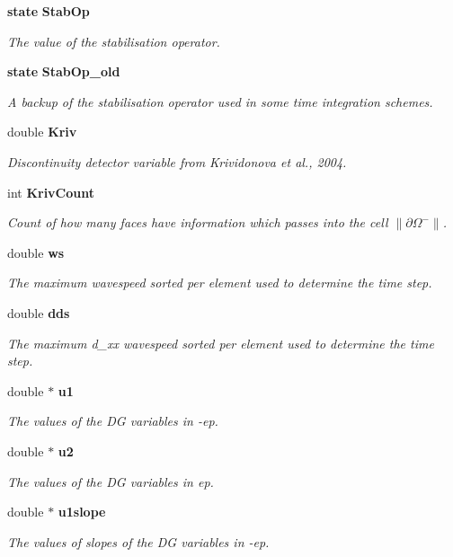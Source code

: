 \begin{DoxyCompactItemize}
{\bf state} {\bf Stab\-Op}
\begin{DoxyCompactList}\small\item\em The value of the stabilisation operator. \end{DoxyCompactList}\item 
{\bf state} {\bf Stab\-Op\-\_\-old}
\begin{DoxyCompactList}\small\item\em A backup of the stabilisation operator used in some time integration schemes. \end{DoxyCompactList}\item 
double {\bf Kriv}
\begin{DoxyCompactList}\small\item\em Discontinuity detector variable from Krividonova et al., 2004. \end{DoxyCompactList}\item 
int {\bf Kriv\-Count}
\begin{DoxyCompactList}\small\item\em Count of how many faces have information which passes into the cell $\| \partial\Omega^- \|$. \end{DoxyCompactList}\item 
double {\bf ws}
\begin{DoxyCompactList}\small\item\em The maximum wavespeed sorted per element used to determine the time step. \end{DoxyCompactList}\item 
double {\bf dds}
\begin{DoxyCompactList}\small\item\em The maximum d\-\_\-xx wavespeed sorted per element used to determine the time step. \end{DoxyCompactList}\item 
double $\ast$ {\bf u1}
\begin{DoxyCompactList}\small\item\em The values of the D\-G variables in -\/ep. \end{DoxyCompactList}\item 
double $\ast$ {\bf u2}
\begin{DoxyCompactList}\small\item\em The values of the D\-G variables in ep. \end{DoxyCompactList}\item 
double $\ast$ {\bf u1slope}
\begin{DoxyCompactList}\small\item\em The values of slopes of the D\-G variables in -\/ep. \end{DoxyCompactList}\item 

\end{DoxyCompactItemize}
